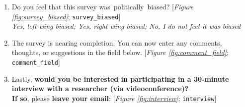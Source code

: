 \begin{enumerate}[resume]
\item  \label{q:survey_biased} Do you feel that this survey was~politically~biased? [\textit{Figure \ref{fig:survey_biased}}; 
\verb|survey_biased|]
  \\ \textit{Yes, left-wing biased; Yes, right-wing biased; No, I do not feel it was biased}

\item  \label{q:comment_field} The survey is nearing completion. You can now enter any comments, thoughts, or suggestions in the field below. [\textit{Figure \ref{fig:comment_field}}; 
\verb|comment_field|]


\item  \label{q:interview} Lastly, \textbf{would you be interested in participating in a 30-minute interview with a researcher (via videoconference)? }\\\textbf{If so}, please \textbf{leave your email}: [\textit{Figure \ref{fig:interview}}; 
\verb|interview|]

 \end{enumerate} 

